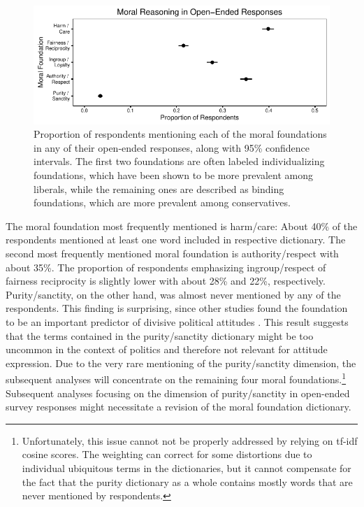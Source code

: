\documentclass[12pt]{article}
\begin{document}
\begin{figure}[ht]\centering
\includegraphics{../calc/fig/prop_mft.pdf}
\caption{Proportion of respondents mentioning each of the moral foundations in any of their open-ended responses, along with 95\% confidence intervals. The first two foundations are often labeled individualizing foundations, which have been shown to be more prevalent among liberals, while the remaining ones are described as binding foundations, which are more prevalent among conservatives.}\label{fig:prop_ideol}
\end{figure}

The moral foundation most frequently mentioned is harm/care: About 40\% of the respondents mentioned at least one word included in respective dictionary. The second most frequently mentioned moral foundation is authority/respect with about 35\%. The proportion of respondents emphasizing ingroup/respect of fairness reciprocity is slightly lower with about 28\% and 22\%, respectively. Purity/sanctity, on the other hand, was almost never mentioned by any of the respondents. This finding is surprising, since other studies found the foundation to be an important predictor of divisive political attitudes \citep{koleva2012tracing}. This result suggests that the terms contained in the purity/sanctity dictionary might be too uncommon in the context of politics and therefore not relevant for attitude expression. Due to the very rare mentioning of the purity/sanctity dimension, the subsequent analyses will concentrate on the remaining four moral foundations.\footnote{Unfortunately, this issue cannot not be properly addressed by relying on tf-idf cosine scores. The weighting can correct for some distortions due to individual ubiquitous terms in the dictionaries, but it cannot compensate for the fact that the purity dictionary as a whole contains mostly words that are never mentioned by respondents.} Subsequent analyses focusing on the dimension of purity/sanctity in open-ended survey responses might necessitate a revision of the moral foundation dictionary.
\end{document}
